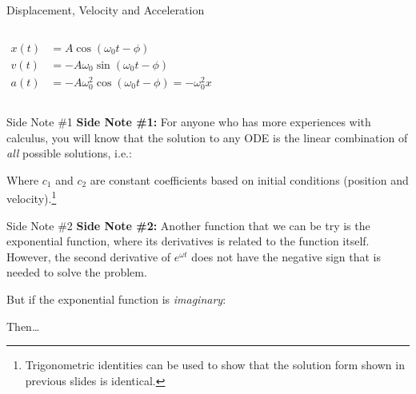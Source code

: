 \documentclass[12pt,compress,aspectratio=169]{beamer}
\begin{document}
\begin{frame}{Displacement, Velocity and Acceleration}
  \begin{columns}
    \begin{align*}
      x(t)&=A\cos(\omega_0 t-\phi)\\
      v(t)&=-A\omega_0\sin(\omega_0 t-\phi)\\
      a(t)&=-A\omega_0^2\cos(\omega_0 t-\phi)=-\omega_0^2x
    \end{align*}

  \end{columns}
\end{frame}



\begin{frame}{Side Note \#1}
  \textbf{Side Note \#1:} For anyone who has more experiences with calculus,
  you will know that the solution to any ODE is the linear combination of
  \emph{all} possible solutions, i.e.:


  Where $c_1$ and $c_2$ are constant coefficients based on initial conditions
  (position and velocity).\footnote{Trigonometric identities can be used to
  show that the solution form shown in previous slides is identical.}
\end{frame}



\begin{frame}{Side Note \#2}
  \textbf{Side Note \#2:} Another function that we can be try is the
  exponential function, where its derivatives is related to the function
  itself. However, the second derivative of $e^{\omega t}$ does not have the
  negative sign that is needed to solve the problem.


  But if the exponential function is \emph{imaginary}:


  \vspace{-.1in}Then\ldots
\end{frame}
\end{document}
